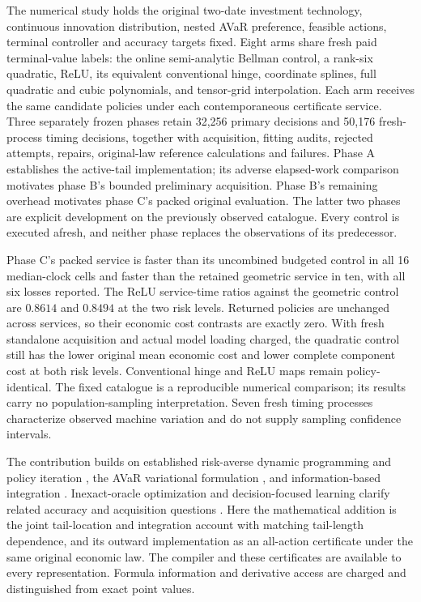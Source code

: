 The numerical study holds the original two-date investment technology,
continuous innovation distribution, nested AVaR preference, feasible actions,
terminal controller and accuracy targets fixed. Eight arms share fresh paid
terminal-value labels: the online semi-analytic Bellman control, a rank-six
quadratic, ReLU, its equivalent conventional hinge, coordinate splines, full
quadratic and cubic polynomials, and tensor-grid interpolation. Each arm
receives the same candidate policies under each contemporaneous certificate
service. Three separately frozen phases retain 32,256 primary decisions and
50,176 fresh-process timing decisions, together with acquisition, fitting
audits, rejected attempts, repairs, original-law reference calculations and
failures. Phase A establishes the active-tail implementation; its adverse
elapsed-work comparison motivates phase B's bounded preliminary acquisition.
Phase B's remaining overhead motivates phase C's packed original evaluation.
The latter two phases are explicit development on the previously observed
catalogue. Every control is executed afresh, and neither phase replaces the
observations of its predecessor.

Phase C's packed service is faster than its uncombined budgeted control in
all 16 median-clock cells and faster than the retained geometric service in
ten, with all six losses reported. The ReLU service-time ratios against the
geometric control are $0.8614$ and $0.8494$ at the two risk levels. Returned
policies are unchanged across services, so their economic cost contrasts are
exactly zero. With fresh standalone acquisition and actual model loading
charged, the quadratic control still has the lower original mean economic
cost and lower complete component cost at both risk levels. Conventional
hinge and ReLU maps remain policy-identical. The fixed catalogue is a
reproducible numerical comparison; its results carry no population-sampling
interpretation. Seven fresh timing processes characterize observed machine
variation and do not supply sampling confidence intervals.

The contribution builds on established risk-averse dynamic programming and
policy iteration \citep{ruszczynski2010risk,ruszczynski2014erratum}, the AVaR
variational formulation \citep{rockafellaruryasev2002}, and information-based
integration \citep{Novak2015Integration97}. Inexact-oracle optimization and
decision-focused learning clarify related accuracy and acquisition questions
\citep{DevolderGlineurNesterov2014,ElmachtoubGrigas2022}. Here the mathematical
addition is the joint tail-location and integration account with matching
tail-length dependence, and its outward implementation as an all-action
certificate under the same original economic law. The compiler and these
certificates are available to every representation. Formula information and
derivative access are charged and distinguished from exact point values.

